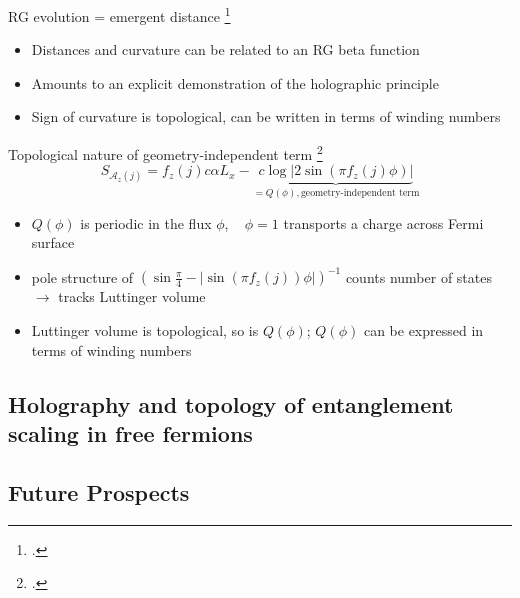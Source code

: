 \documentclass[8pt,aspectratio=169]{beamer}
\newcommand{\nitem}{\item[\ding{51}]}
\begin{document}
\begin{frame}{RG evolution = emergent distance}
	\footcite{maldacena1999large,ryu2006aspects,holzhey_1994}
\begin{itemize}
	\nitem Distances and curvature can be related to an RG \alert{beta function}\\[10pt]
	\nitem Amounts to an \alert{explicit demonstration} of the holographic principle\\[10pt]
	\nitem Sign of curvature is \alert{topological}, can be written in terms of winding numbers\\[10pt]
\end{itemize}
	
\end{frame}

\begin{frame}{Topological nature of geometry-independent term}
	\footcite{luttinger1960ground,luttinger1960fermi,oshikawa2000topological,seki2017topological,anirbanurg1,Heath_2020}
	\[S_{\mathcal{A}_z(j)} = f_z(j) c \alpha L_x - \underbrace{c \log \big|2\sin\left(\pi f_z(j)\phi\right)\big|}_{=Q(\phi),\text{geometry-independent term}}\]
	\begin{itemize}
	\nitem \(Q(\phi)\) is periodic in the flux \(\phi\), ~ \(\phi=1\) transports a charge across Fermi surface\\[10pt]
	\nitem pole structure of \(\left(\sin \frac{\pi}{4} - |\sin\left(\pi f_z(j)\right)\phi|\right)^{-1}\) counts number of states \(\longrightarrow\) tracks Luttinger volume\\[10pt]
	\nitem Luttinger volume is topological, so is \(Q(\phi)\); \(Q(\phi)\) can be expressed in terms of winding numbers
	\end{itemize}
	
\end{frame}

\begin{frame}{}
\section{Holography and topology of entanglement scaling in free fermions}
\end{frame}


\begin{frame}{}
\section{Future Prospects}
\end{frame}
\end{document}
